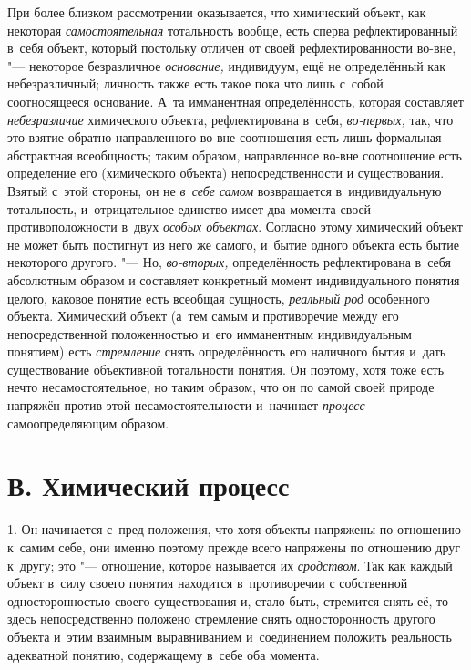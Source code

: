 При более близком рассмотрении оказывается, что химический
объект, как некоторая
{\em самостоятельная}
тотальность вообще, есть сперва рефлектированный в~себя
объект, который постольку отличен от своей рефлектированности во-вне, "---
некоторое безразличное
{\em основание,}
индивидуум, ещё не определённый как небезразличный; личность
также есть такое пока что лишь с~собой соотносящееся
основание.
А~та имманентная определённость, которая составляет
{\em небезразличие}
химического объекта, рефлектирована в~себя,
{\em во-первых,} так, что
это взятие обратно направленного во-вне соотношения есть лишь формальная
абстрактная всеобщность; таким образом, направленное во-вне соотношение
есть определение его (химического объекта) непосредственности и
существования. Взятый с~этой стороны, он не
{\em в~себе самом}
возвращается в~индивидуальную тотальность, и~отрицательное
единство имеет два момента своей противоположности в~двух
{\em особых объектах}.
Согласно этому химический объект не может быть постигнут из
него же самого, и~бытие одного объекта есть бытие некоторого другого. "---
Но, {\em во-вторых,}
определённость рефлектирована в~себя абсолютным образом и
составляет конкретный момент индивидуального понятия целого, каковое
понятие есть всеобщая сущность,
{\em реальный род}
особенного объекта. Химический объект (а~тем самым и
противоречие между его непосредственной положенностью и~его имманентным
индивидуальным понятием) есть
{\em стремление} снять
определённость его наличного бытия и~дать существование объективной
тотальности понятия. Он поэтому, хотя тоже есть нечто несамостоятельное, но
таким образом, что он по самой своей природе напряжён против этой
несамостоятельности и~начинает
{\em процесс}
самоопределяющим образом.

\section[В. Химический процесс]{В. Химический процесс}

1. Он начинается с~пред-положения, что хотя объекты напряжены
по отношению к~самим себе, они именно поэтому прежде всего напряжены по
отношению друг к~другу; это "--- отношение, которое называется
их {\em сродством}. Так
как каждый объект в~силу своего понятия находится в~противоречии с
собственной односторонностью своего существования и, стало быть, стремится
снять её, то здесь непосредственно положено стремление снять
односторонность другого объекта и~этим взаимным выравниванием и~соединением
положить реальность адекватной понятию, содержащему в~себе оба момента.

